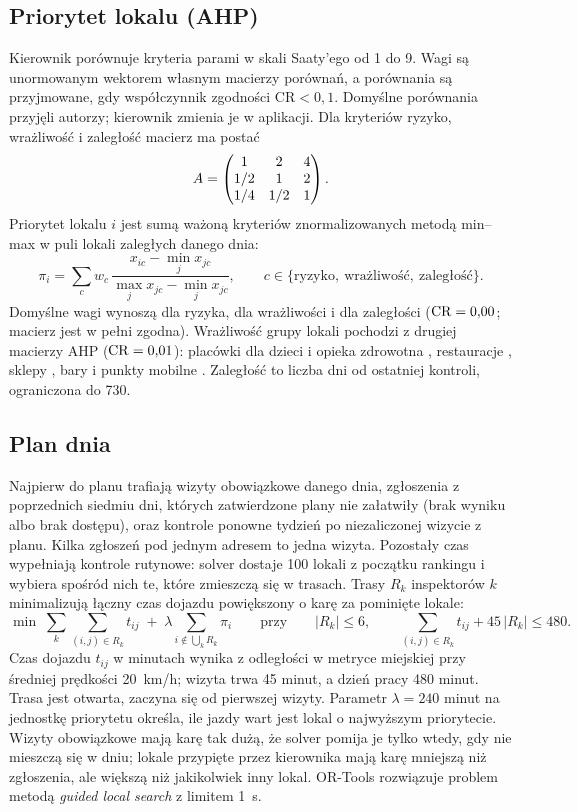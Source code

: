 \documentclass[11pt,a4paper]{article}
\begin{document}
\subsection{Priorytet lokalu (AHP)}

Kierownik porównuje kryteria parami w skali Saaty'ego od 1 do 9. Wagi są unormowanym wektorem
własnym macierzy porównań, a porównania są przyjmowane, gdy współczynnik zgodności
$\mathrm{CR} < 0{,}1$. Domyślne porównania przyjęli autorzy; kierownik zmienia je w aplikacji.
Dla kryteriów ryzyko, wrażliwość i zaległość macierz ma postać
\[
  A = \begin{pmatrix} 1 & 2 & 4 \\ 1/2 & 1 & 2 \\ 1/4 & 1/2 & 1 \end{pmatrix}.
\] Priorytet lokalu $i$ jest sumą ważoną kryteriów znormalizowanych
metodą min--max w puli lokali zaległych danego dnia:
\[
  \pi_i = \sum_{c} w_c\, \frac{x_{ic} - \min_j x_{jc}}{\max_j x_{jc} - \min_j x_{jc}},
  \qquad c \in \{\text{ryzyko},\ \text{wrażliwość},\ \text{zaległość}\}.
\]
Domyślne wagi wynoszą \WRisk{} dla ryzyka, \WVuln{} dla wrażliwości i \WOverdue{} dla zaległości
($\mathrm{CR} = \text{0,00}$; macierz jest w pełni zgodna). Wrażliwość grupy lokali pochodzi
z drugiej macierzy AHP ($\mathrm{CR} = \text{0,01}$): placówki dla dzieci i opieka zdrowotna \GChildren, restauracje
\GRest, sklepy \GRetail, bary i punkty mobilne \GOther. Zaległość to liczba dni od ostatniej
kontroli, ograniczona do 730.

\subsection{Plan dnia}

Najpierw do planu trafiają wizyty obowiązkowe danego dnia, zgłoszenia z poprzednich siedmiu dni,
których zatwierdzone plany nie załatwiły (brak wyniku albo brak dostępu), oraz kontrole ponowne
tydzień po niezaliczonej wizycie z planu. Kilka zgłoszeń pod jednym adresem to jedna wizyta. Pozostały czas wypełniają kontrole rutynowe: solver dostaje 100 lokali z początku
rankingu i wybiera spośród nich te, które zmieszczą się w trasach. Trasy $R_k$ inspektorów
$k$ minimalizują łączny czas dojazdu powiększony o karę za pominięte lokale:
\[
  \min \;\sum_k \sum_{(i,j)\in R_k} t_{ij} \;+\; \lambda \!\!\sum_{i \notin \bigcup_k R_k}\!\! \pi_i
  \qquad\text{przy}\qquad |R_k| \le 6, \qquad \sum_{(i,j)\in R_k} t_{ij} + 45\,|R_k| \le 480 .
\]
Czas dojazdu $t_{ij}$ w minutach wynika z odległości w metryce miejskiej przy średniej
prędkości 20~km/h; wizyta trwa 45 minut, a dzień pracy 480 minut. Trasa jest otwarta, zaczyna
się od pierwszej wizyty. Parametr $\lambda = 240$ minut na jednostkę priorytetu określa, ile
jazdy wart jest lokal o najwyższym priorytecie. Wizyty obowiązkowe mają karę tak dużą, że
solver pomija je tylko wtedy, gdy nie mieszczą się w dniu; lokale przypięte przez kierownika
mają karę mniejszą niż zgłoszenia, ale większą niż jakikolwiek inny lokal. OR-Tools rozwiązuje
problem metodą \textit{guided local search} z limitem 1~s.
\end{document}
